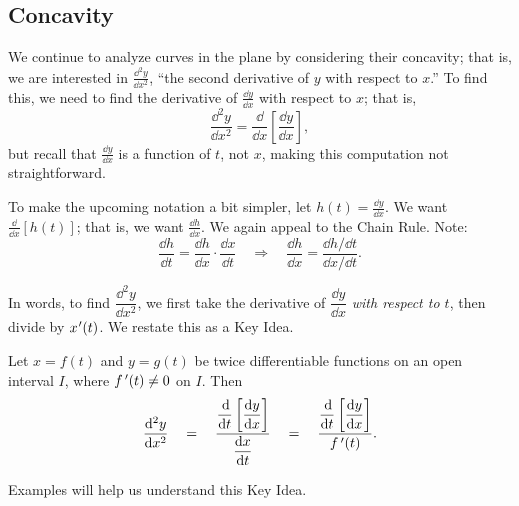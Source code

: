 \subsection{Concavity}

We continue to analyze curves in the plane by considering their concavity; that is, we are interested in $\frac{\dd^2y}{\dd x^2}$, ``the second derivative of $y$ with respect to $x$.'' To find this, we need to find the derivative of $\frac{\dd y}{\dd x}$ with respect to $x$; that is,
\[\frac{\dd^2y}{\dd x^2}=\frac{\dd}{\dd x}\left[\frac{\dd y}{\dd x}\right],\]
but recall that $\frac{\dd y}{\dd x}$ is a function of $t$, not $x$, making this computation not straightforward. 

To make the upcoming notation a bit simpler, let $h(t) = \frac{\dd y}{\dd x}$. We want $\frac{\dd}{\dd x}[h(t)]$; that is, we want $\frac{\dd h}{\dd x}$. We again appeal to the Chain Rule. Note:
\[
\frac{\dd h}{\dd t} = \frac{\dd h}{\dd x}\cdot\frac{\dd x}{\dd t}
\quad \Rightarrow \quad
\frac{\dd h}{\dd x} = \frac{\dd h/\dd t}{\dd x/\dd t}.
\]

In words, to find $\dfrac{\dd^2y}{\dd x^2}$, we first take the derivative of $\dfrac{\dd y}{\dd x}$ \emph{with respect to $t$}, then divide by $x\primeskip'(t)$. We restate this as a Key Idea.

\begin{keyidea}\label{idea:second_der_par}%
Let $x=f(t)$ and $y=g(t)$ be twice differentiable functions on an open interval $I$, where $f\,'(t)\neq 0$ on $I$. Then 
\[
\frac{\dd^2y}{\dd x^2}
\quad = \quad
\frac{\dfrac{\dd}{\dd t}\left[\dfrac{\dd y}{\dd x}\right]}{\dfrac{\dd x}{\dd t}}
\quad=\quad
\frac{\dfrac{\dd}{\dd t}\left[\dfrac{\dd y}{\dd x}\right]}{\fp(t)}.
\] 
\end{keyidea}

Examples will help us understand this Key Idea.


